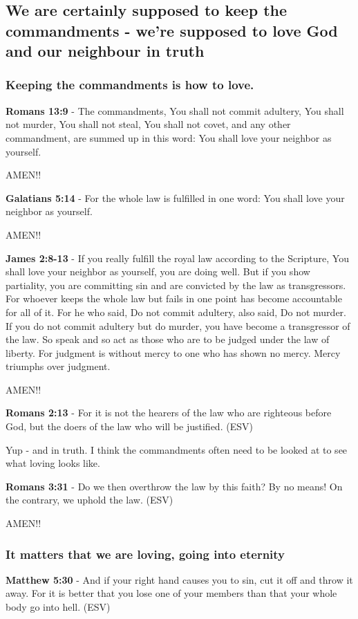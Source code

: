 \documentclass[11pt]{article}
\begin{document}
\subsection{We are certainly supposed to keep the commandments - we're supposed to love God and our neighbour in truth}
\label{sec:org8e694ec}
\subsubsection{Keeping the commandments is how to love.}
\label{sec:orgb31e19a}

\textbf{Romans 13:9} - The commandments, You shall not commit adultery, You shall not murder, You shall not steal, You shall not covet, and any other commandment, are summed up in this word: You shall love your neighbor as yourself.

AMEN!!

\textbf{Galatians 5:14} - For the whole law is fulfilled in one word: You shall love your neighbor as yourself.

AMEN!!

\textbf{James 2:8-13} - If you really fulfill the royal law according to the Scripture, You shall love your neighbor as yourself, you are doing well.  But if you show partiality, you are committing sin and are convicted by the law as transgressors.  For whoever keeps the whole law but fails in one point has become accountable for all of it.  For he who said, Do not commit adultery, also said, Do not murder. If you do not commit adultery but do murder, you have become a transgressor of the law.  So speak and so act as those who are to be judged under the law of liberty.  For judgment is without mercy to one who has shown no mercy. Mercy triumphs over judgment.

AMEN!!

\textbf{Romans 2:13} - For it is not the hearers of the law who are righteous before God, but the doers of the law who will be justified. (ESV)

Yup - and in truth. I think the commandments often need to be looked at to see what loving looks like.

\textbf{Romans 3:31} - Do we then overthrow the law by this faith? By no means! On the contrary, we uphold the law. (ESV)

AMEN!!

\subsubsection{It matters that we are loving, going into eternity}
\label{sec:orga4fe020}
\textbf{Matthew 5:30} -  And if your right hand causes you to sin, cut it off and throw it away.  For it is better that you lose one of your members than that your whole body go into hell.  (ESV)
\end{document}
